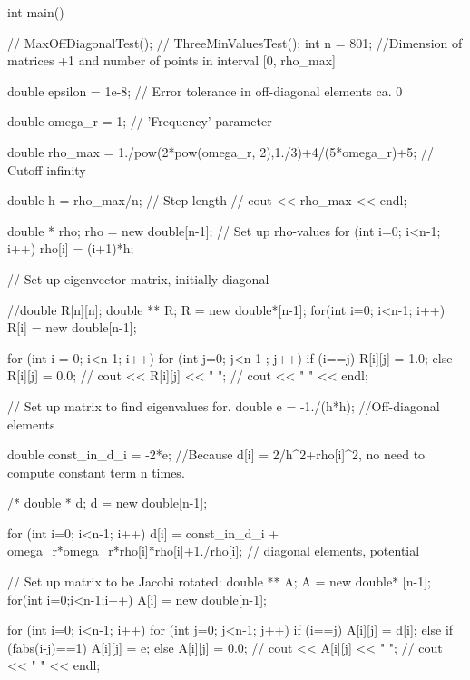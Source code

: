 \documentclass[norsk, 12pt]{article}
\begin{document}
int main()
{
//    MaxOffDiagonalTest();
//    ThreeMinValuesTest();
    int n = 801; //Dimension of matrices +1 and number of points in interval [0, rho_max]


    double epsilon = 1e-8;  // Error tolerance in off-diagonal elements ca. 0


    double omega_r = 1; // 'Frequency' parameter

    double rho_max = 1./pow(2*pow(omega_r, 2),1./3)+4/(5*omega_r)+5;          // Cutoff \approx infinity


    double h = rho_max/n;  // Step length
//    cout << rho_max << endl;


    double * rho;
    rho = new double[n-1];
    // Set up rho-values
    for (int i=0; i<n-1; i++){
        rho[i] = (i+1)*h;
    }

    // Set up eigenvector matrix, initially diagonal


    //double R[n][n];
    double ** R;
    R = new double*[n-1];
    for(int i=0; i<n-1; i++){
        R[i] = new double[n-1];
    }

    for (int i = 0; i<n-1; i++){
        for (int j=0; j<n-1 ; j++){
            if (i==j){
                R[i][j] = 1.0;
            }
            else {
                R[i][j] = 0.0;
            }
//        cout << R[i][j] << " ";
        }
//        cout <<    "    " << endl;
    }



// Set up matrix to find eigenvalues for.
    double e = -1./(h*h);   //Off-diagonal elements

    double const_in_d_i = -2*e;    //Because d[i] = 2/h^2+rho[i]^2, no need to compute constant term n times.

/*
    double * d;
    d = new double[n-1];

    for (int i=0; i<n-1; i++){
        d[i] = const_in_d_i + omega_r*omega_r*rho[i]*rho[i]+1./rho[i];    // diagonal elements, potential
    }




    // Set up matrix to be Jacobi rotated:
    double ** A;
    A = new double* [n-1];
    for(int i=0;i<n-1;i++){
        A[i] = new double[n-1];
    }

    for (int i=0; i<n-1; i++){
        for (int j=0; j<n-1; j++){
            if (i==j){
                A[i][j] = d[i];
            }
            else if (fabs(i-j)==1){
                A[i][j] = e;
            }
            else {
                A[i][j] = 0.0;
            }
//            cout << A[i][j] << "    ";
        }
//        cout << "   " << endl;
    }



}
\end{document}
